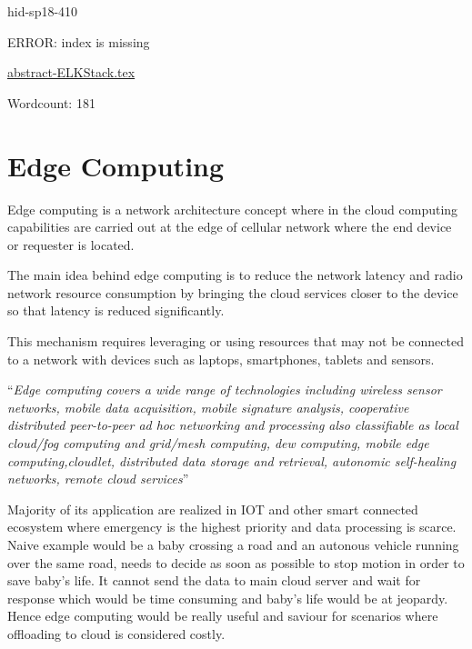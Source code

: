 \begin{IU}

hid-sp18-410

ERROR: index is missing

\href{https://github.com/cloudmesh-community/hid-sp18-410/blob/master//technology/abstract-ELKStack.tex}{abstract-ELKStack.tex}

 

Wordcount: 181

\end{IU}

\section{Edge Computing}

Edge computing is a network architecture concept where in the cloud 
computing capabilities are carried out at the edge of cellular network
where the end device or requester is located.

The main idea behind edge computing is to reduce the network latency and
radio network resource consumption by bringing the cloud services closer
to the device so that latency is reduced significantly.

This mechanism requires leveraging or using resources that may not be 
connected to a network with devices such as laptops, smartphones, 
tablets and sensors.

\color{blue}``\emph{Edge computing covers a wide range of technologies including wireless 
sensor networks, mobile data acquisition, mobile signature analysis, 
cooperative distributed peer-to-peer ad hoc networking and processing 
also classifiable as local cloud/fog computing and grid/mesh computing, 
dew computing, mobile edge computing,cloudlet, distributed data storage
and retrieval, autonomic self-healing networks,
remote cloud services}''\color{black}~\cite{hid-sp18-410-edge}

Majority of its application are realized in IOT and other smart connected
ecosystem where emergency is the highest priority and data processing
is scarce. Naive example would be a baby crossing a road and an autonous
vehicle running over the same road, needs to decide as soon as possible
to stop motion in order to save baby's life. It cannot send the data to
main cloud server and wait for response which would be time consuming and
baby's life would be at jeopardy.
Hence edge computing would be really useful and saviour for scenarios where
offloading to cloud is considered costly.


